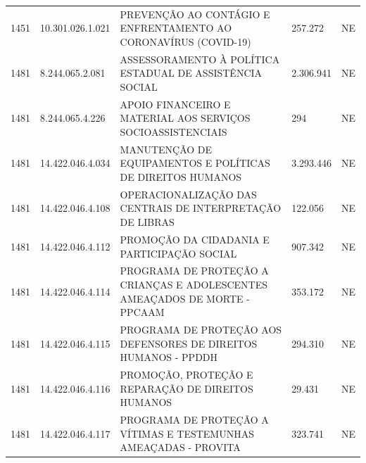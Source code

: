 \documentclass{article}
\begin{document}
\begin{longtable}[c]{m{1cm}|m{2cm}|m{10cm}|m{2cm}|m{1cm}}
\multicolumn{1}{C{1cm}|}{1451} & \multicolumn{1}{C{2cm}|}{10.301.026.1.021} & \multicolumn{1}{L{10cm}|}{PREVENÇÃO AO CONTÁGIO E ENFRENTAMENTO AO CORONAVÍRUS (COVID-19)} & \multicolumn{1}{R{2cm}|}{257.272} & \multicolumn{1}{C{1cm}}{NE} \\
\multicolumn{1}{C{1cm}|}{1481} & \multicolumn{1}{C{2cm}|}{8.244.065.2.081} & \multicolumn{1}{L{10cm}|}{ASSESSORAMENTO À POLÍTICA ESTADUAL DE ASSISTÊNCIA SOCIAL} & \multicolumn{1}{R{2cm}|}{2.306.941} & \multicolumn{1}{C{1cm}}{NE} \\
\multicolumn{1}{C{1cm}|}{1481} & \multicolumn{1}{C{2cm}|}{8.244.065.4.226} & \multicolumn{1}{L{10cm}|}{APOIO FINANCEIRO E MATERIAL AOS SERVIÇOS SOCIOASSISTENCIAIS} & \multicolumn{1}{R{2cm}|}{294} & \multicolumn{1}{C{1cm}}{NE} \\
\multicolumn{1}{C{1cm}|}{1481} & \multicolumn{1}{C{2cm}|}{14.422.046.4.034} & \multicolumn{1}{L{10cm}|}{MANUTENÇÃO DE EQUIPAMENTOS E POLÍTICAS DE DIREITOS HUMANOS} & \multicolumn{1}{R{2cm}|}{3.293.446} & \multicolumn{1}{C{1cm}}{NE} \\
\multicolumn{1}{C{1cm}|}{1481} & \multicolumn{1}{C{2cm}|}{14.422.046.4.108} & \multicolumn{1}{L{10cm}|}{OPERACIONALIZAÇÃO DAS CENTRAIS DE INTERPRETAÇÃO DE LIBRAS} & \multicolumn{1}{R{2cm}|}{122.056} & \multicolumn{1}{C{1cm}}{NE} \\
\multicolumn{1}{C{1cm}|}{1481} & \multicolumn{1}{C{2cm}|}{14.422.046.4.112} & \multicolumn{1}{L{10cm}|}{PROMOÇÃO DA CIDADANIA E PARTICIPAÇÃO SOCIAL} & \multicolumn{1}{R{2cm}|}{907.342} & \multicolumn{1}{C{1cm}}{NE} \\
\multicolumn{1}{C{1cm}|}{1481} & \multicolumn{1}{C{2cm}|}{14.422.046.4.114} & \multicolumn{1}{L{10cm}|}{PROGRAMA DE PROTEÇÃO A CRIANÇAS E ADOLESCENTES AMEAÇADOS DE MORTE - PPCAAM} & \multicolumn{1}{R{2cm}|}{353.172} & \multicolumn{1}{C{1cm}}{NE} \\
\multicolumn{1}{C{1cm}|}{1481} & \multicolumn{1}{C{2cm}|}{14.422.046.4.115} & \multicolumn{1}{L{10cm}|}{PROGRAMA DE PROTEÇÃO AOS DEFENSORES DE DIREITOS HUMANOS - PPDDH} & \multicolumn{1}{R{2cm}|}{294.310} & \multicolumn{1}{C{1cm}}{NE} \\
\multicolumn{1}{C{1cm}|}{1481} & \multicolumn{1}{C{2cm}|}{14.422.046.4.116} & \multicolumn{1}{L{10cm}|}{PROMOÇÃO, PROTEÇÃO E REPARAÇÃO DE DIREITOS HUMANOS} & \multicolumn{1}{R{2cm}|}{29.431} & \multicolumn{1}{C{1cm}}{NE} \\
\multicolumn{1}{C{1cm}|}{1481} & \multicolumn{1}{C{2cm}|}{14.422.046.4.117} & \multicolumn{1}{L{10cm}|}{PROGRAMA DE PROTEÇÃO A VÍTIMAS E TESTEMUNHAS AMEAÇADAS - PROVITA} & \multicolumn{1}{R{2cm}|}{323.741} & \multicolumn{1}{C{1cm}}{NE} \\

\end{longtable}
\end{document}
